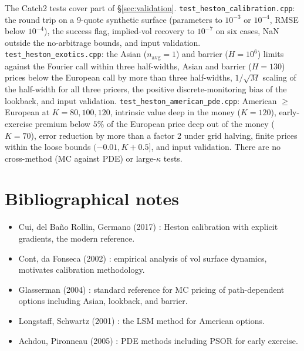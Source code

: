 \documentclass[11pt]{article}
\theoremstyle{plain}
\theoremstyle{definition}
\theoremstyle{remark}
\begin{document}
The Catch2 tests cover part of \S\ref{sec:validation}. \texttt{test\_heston\_calibration.cpp}: the round trip on a 9-quote synthetic surface (parameters to $10^{-3}$ or $10^{-4}$, RMSE below $10^{-4}$), the success flag, implied-vol recovery to $10^{-7}$ on six cases, NaN outside the no-arbitrage bounds, and input validation. \texttt{test\_heston\_exotics.cpp}: the Asian ($n_{\mathrm{avg}} = 1$) and barrier ($H = 10^6$) limits against the Fourier call within three half-widths, Asian and barrier ($H = 130$) prices below the European call by more than three half-widths, $1/\sqrt{M}$ scaling of the half-width for all three pricers, the positive discrete-monitoring bias of the lookback, and input validation. \texttt{test\_heston\_american\_pde.cpp}: American $\geq$ European at $K = 80, 100, 120$, intrinsic value deep in the money ($K = 120$), early-exercise premium below $5\%$ of the European price deep out of the money ($K = 70$), error reduction by more than a factor 2 under grid halving, finite prices within the loose bounds $(-0.01, K + 0.5]$, and input validation. There are no cross-method (MC against PDE) or large-$\kappa$ tests.

\endgroup
\section{Bibliographical notes}

\begin{itemize}[topsep=2pt]
    \item Cui, del Ba\~no Rollin, Germano (2017) \cite{Cui2017}: Heston calibration with explicit gradients, the modern reference.
    \item Cont, da Fonseca (2002) \cite{ContFonseca2002}: empirical analysis of vol surface dynamics, motivates calibration methodology.
    \item Glasserman (2004) \cite{Glasserman2004}: standard reference for MC pricing of path-dependent options including Asian, lookback, and barrier.
    \item Longstaff, Schwartz (2001) \cite{LongstaffSchwartz2001}: the LSM method for American options.
    \item Achdou, Pironneau (2005) \cite{AchdouPironneau2005}: PDE methods including PSOR for early exercise.
\end{itemize}
\end{document}
